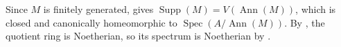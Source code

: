 Since $M$ is finitely generated,  gives $\operatorname{Supp}(M)=V(\operatorname{Ann}(M))$, which is closed and canonically homeomorphic to $\operatorname{Spec}(A/\operatorname{Ann}(M))$. By , the quotient ring is Noetherian, so its spectrum is Noetherian by .
